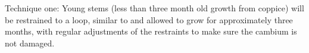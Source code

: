 Technique one: Young stems (less than three month old growth from coppice) will
be restrained to a loop, similar to \cite{jacobs1945l} and allowed to
grow for approximately three months, with regular adjustments of the restraints
to make sure the cambium is not damaged.